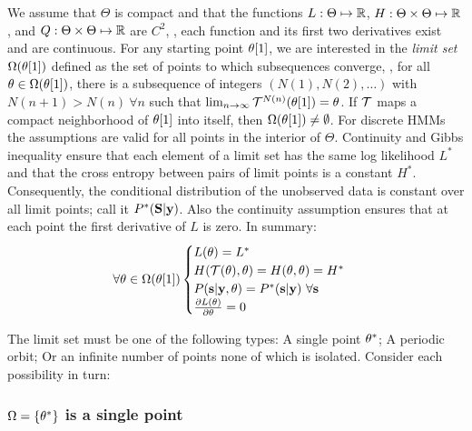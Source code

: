 We assume that $\Theta$ is compact and that the functions $L:\Theta
\mapsto \mathbb{R}$, $H:\Theta \times \Theta \mapsto \mathbb{R}$, and $Q:\Theta
\times \Theta \mapsto \mathbb{R}$ are $C^2$, \ie, each function and its
first two derivatives exist and are continuous.  For any starting
point ${\theta}{[1]}$, we are interested in the \emph{limit set}
$\Omega({\theta}{[1]})$ defined as the set of points to which
subsequences converge, \ie, for all $\theta \in
\Omega({\theta}{[1]})$, there is a subsequence of integers
$\left( N(1), N(2), \ldots \right)$ with $N(n+1) > N(n)~ \forall
n$ such that $\lim_{n \rightarrow \infty}
\EMmap^{N(n)}(\ti{\parameters}{1}) = \parameters$.  If $\EMmap$ maps a
compact neighborhood of ${\theta}{[1]}$ into itself, then
$\Omega({\theta}{[1]}) \neq \emptyset$.  For discrete HMMs the
assumptions are valid for all points in the interior of $\Theta$.
Continuity and Gibbs inequality ensure that each element of a limit
set has the same log likelihood $L^*$ and that the cross entropy
between pairs of limit points is a constant $H^*$.  Consequently, the
conditional distribution of the unobserved data is constant over all
limit points; call it $P^*({\bf S}|\mathbf{y})$.  Also the continuity assumption
ensures that at each point the first derivative of $L$ is zero.  In
summary:
\begin{equation}
  \label{eq:OmegaFlat}
  \forall \parameters \in \Omega(\ti{\parameters}{1})
  \begin{cases}
    L(\parameters) = L^*\\
    H(\EMmap(\parameters), \parameters) = H(\parameters, \parameters) = H^* \\
    P(\s|\y,\parameters) = P^*(\s|\y)~\forall \s \\
    \frac{\partial L(\parameters)}{\partial \parameters} = 0
  \end{cases}
\end{equation}

The limit set must be one of the following types: A single point
$\theta^*$; A periodic orbit; Or an infinite number of points
none of which is isolated.  Consider each possibility in turn:

\subsubsection{$\Omega = \{\theta^*\}$ is a single point}
\label{sec:EMsingle}

